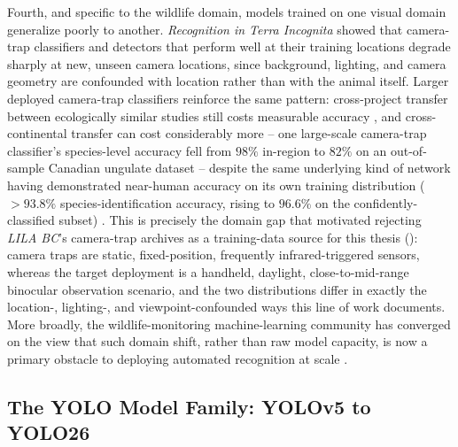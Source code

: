 Fourth, and specific to the wildlife domain, models trained on one visual domain generalize poorly to another. \textit{Recognition in Terra Incognita} \cite{beeryRecognitionTerraIncognita2018} showed that camera-trap classifiers and detectors that perform well at their training locations degrade sharply at new, unseen camera locations, since background, lighting, and camera geometry are confounded with location rather than with the animal itself. Larger deployed camera-trap classifiers reinforce the same pattern: cross-project transfer between ecologically similar studies still costs measurable accuracy \cite{williIdentifyingAnimalSpecies2019}, and cross-continental transfer can cost considerably more -- one large-scale camera-trap classifier's species-level accuracy fell from $98\%$ in-region to $82\%$ on an out-of-sample Canadian ungulate dataset \cite{tabakMachineLearningClassify2019} -- despite the same underlying kind of network having demonstrated near-human accuracy on its own training distribution ($>93.8\%$ species-identification accuracy, rising to $96.6\%$ on the confidently-classified subset) \cite{norouzzadehAutomaticallyIdentifyingCounting2018}. This is precisely the domain gap that motivated rejecting \textit{LILA BC}'s camera-trap archives as a training-data source for this thesis (): camera traps are static, fixed-position, frequently infrared-triggered sensors, whereas the target deployment is a handheld, daylight, close-to-mid-range binocular observation scenario, and the two distributions differ in exactly the location-, lighting-, and viewpoint-confounded ways this line of work documents. More broadly, the wildlife-monitoring machine-learning community has converged on the view that such domain shift, rather than raw model capacity, is now a primary obstacle to deploying automated recognition at scale \cite{tuiaPerspectivesMachineLearning2022}.

\subsection{The YOLO Model Family: YOLOv5 to YOLO26}\label{sec:lit_yolo_family}

